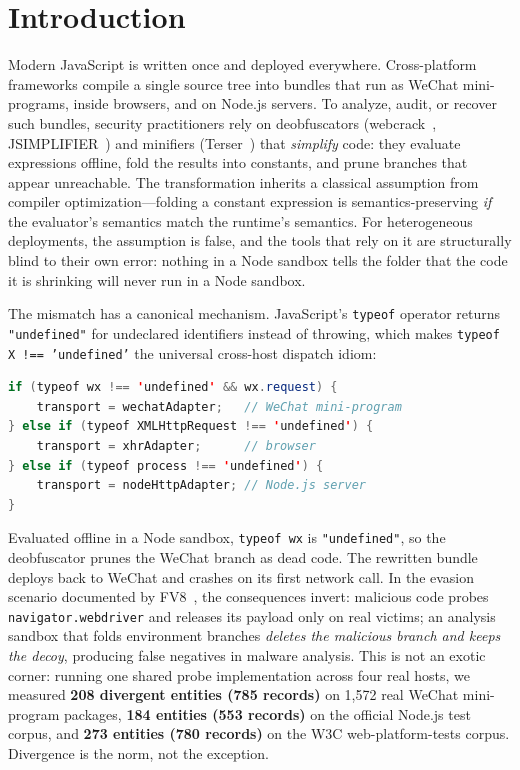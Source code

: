 \documentclass[sigconf,nonacm]{acmart}
\begin{document}
\maketitle

\section{Introduction}

Modern JavaScript is written once and deployed everywhere. Cross-platform frameworks compile a single source tree into bundles that run as WeChat mini-programs, inside browsers, and on Node.js servers. To analyze, audit, or recover such bundles, security practitioners rely on deobfuscators (webcrack~\cite{webcrack}, JSIMPLIFIER~\cite{jsimplifier}) and minifiers (Terser~\cite{terser}) that \emph{simplify} code: they evaluate expressions offline, fold the results into constants, and prune branches that appear unreachable. The transformation inherits a classical assumption from compiler optimization---folding a constant expression is semantics-preserving \emph{if} the evaluator's semantics match the runtime's semantics. For heterogeneous deployments, the assumption is false, and the tools that rely on it are structurally blind to their own error: nothing in a Node sandbox tells the folder that the code it is shrinking will never run in a Node sandbox.

The mismatch has a canonical mechanism. JavaScript's \texttt{typeof} operator returns \texttt{"undefined"} for undeclared identifiers instead of throwing, which makes \texttt{typeof X !== 'undefined'} the universal cross-host dispatch idiom:

\begin{lstlisting}[language=Java, caption={Real-world transport-layer selection (Axios/Taro pattern).}, label={lst:transport}]
if (typeof wx !== 'undefined' && wx.request) {
    transport = wechatAdapter;   // WeChat mini-program
} else if (typeof XMLHttpRequest !== 'undefined') {
    transport = xhrAdapter;      // browser
} else if (typeof process !== 'undefined') {
    transport = nodeHttpAdapter; // Node.js server
}
\end{lstlisting}

Evaluated offline in a Node sandbox, \texttt{typeof wx} is \texttt{"undefined"}, so the deobfuscator prunes the WeChat branch as dead code. The rewritten bundle deploys back to WeChat and crashes on its first network call. In the evasion scenario documented by FV8~\cite{fv8}, the consequences invert: malicious code probes \texttt{navigator.webdriver} and releases its payload only on real victims; an analysis sandbox that folds environment branches \emph{deletes the malicious branch and keeps the decoy}, producing false negatives in malware analysis. This is not an exotic corner: running one shared probe implementation across four real hosts, we measured \textbf{208 divergent entities (785 records)} on 1{,}572 real WeChat mini-program packages, \textbf{184 entities (553 records)} on the official Node.js test corpus, and \textbf{273 entities (780 records)} on the W3C web-platform-tests corpus. Divergence is the norm, not the exception.
\end{document}
